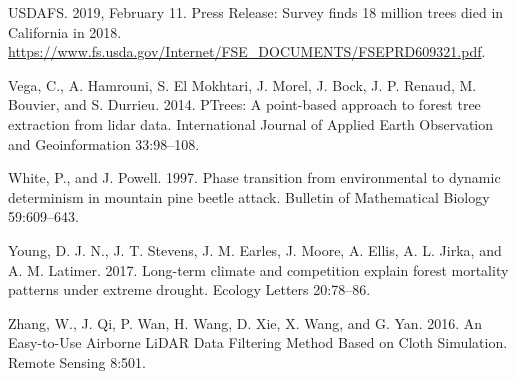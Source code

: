 \documentclass[]{article}
\begin{document}
\hypertarget{ref-usdafs2019}{}
USDAFS. 2019, February 11. Press Release: Survey finds 18 million trees
died in California in 2018.
\url{https://www.fs.usda.gov/Internet/FSE_DOCUMENTS/FSEPRD609321.pdf}.

\hypertarget{ref-vega2014}{}
Vega, C., A. Hamrouni, S. El Mokhtari, J. Morel, J. Bock, J. P. Renaud,
M. Bouvier, and S. Durrieu. 2014. PTrees: A point-based approach to
forest tree extraction from lidar data. International Journal of Applied
Earth Observation and Geoinformation 33:98--108.

\hypertarget{ref-white1997}{}
White, P., and J. Powell. 1997. Phase transition from environmental to
dynamic determinism in mountain pine beetle attack. Bulletin of
Mathematical Biology 59:609--643.

\hypertarget{ref-young2017}{}
Young, D. J. N., J. T. Stevens, J. M. Earles, J. Moore, A. Ellis, A. L.
Jirka, and A. M. Latimer. 2017. Long-term climate and competition
explain forest mortality patterns under extreme drought. Ecology Letters
20:78--86.

\hypertarget{ref-zhang2016}{}
Zhang, W., J. Qi, P. Wan, H. Wang, D. Xie, X. Wang, and G. Yan. 2016. An
Easy-to-Use Airborne LiDAR Data Filtering Method Based on Cloth
Simulation. Remote Sensing 8:501.
\end{document}
